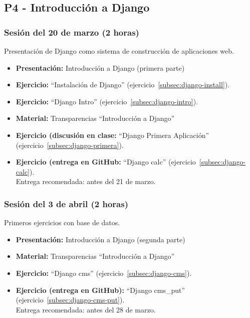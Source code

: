 \documentclass[a4paper,12pt]{article}
\begin{document}
\subsection{P4 - Introducción a Django}

\subsubsection{Sesión del 20 de marzo (2 horas)}

Presentación de Django como sistema de construcción de aplicaciones web.

\begin{itemize}
 \item \textbf{Presentación:} Introducción a Django (primera parte)
 \item \textbf{Ejercicio:} ``Instalación de Django'' (ejercicio~\ref{subsec:django-install}).
 \item \textbf{Ejercicio:} ``Django Intro'' (ejercicio~\ref{subsec:django-intro}).
 \item \textbf{Material:} Transparencias ``Introducción a Django''
  \item \textbf{Ejercicio (discusión en clase:} ``Django Primera Aplicación'' (ejercicio~\ref{subsec:django-primera}).
  \item \textbf{Ejercicio (entrega en GitHub:} ``Django calc'' (ejercicio~\ref{subsec:django-calc}). \\
        Entrega recomendada: antes del 21 de marzo.
\end{itemize}

\subsubsection{Sesión del 3 de abril (2 horas)}

Primeros ejercicios con base de datos.

\begin{itemize}
 \item \textbf{Presentación:} Introducción a Django (segunda parte)
 \item \textbf{Material:} Transparencias ``Introducción a Django''

 \item \textbf{Ejercicio:} ``Django cms'' (ejercicio~\ref{subsec:django-cms}).
 \item \textbf{Ejercicio (entrega en GitHub):} ``Django cms\_put'' (ejercicio~\ref{subsec:django-cms-put}).\\
    Entrega recomendada: antes del 28 de marzo.
 
\end{itemize}
\end{document}
